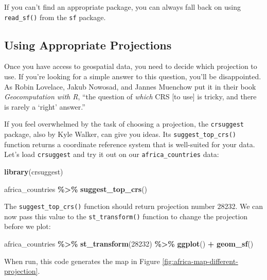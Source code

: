 \documentclass[
]{book}
\newenvironment{Shaded}{\begin{snugshade}}{\end{snugshade}}
\newcommand{\DecValTok}[1]{\textcolor[rgb]{0.00,0.00,0.81}{#1}}
\newcommand{\FunctionTok}[1]{\textcolor[rgb]{0.13,0.29,0.53}{\textbf{#1}}}
\newcommand{\NormalTok}[1]{#1}
\newcommand{\SpecialCharTok}[1]{\textcolor[rgb]{0.81,0.36,0.00}{\textbf{#1}}}
\begin{document}
If you can't find an appropriate package, you can always fall back on using \texttt{read\_sf()} from the \texttt{sf} package.

\hypertarget{using-appropriate-projections}{%
\subsection*{Using Appropriate Projections}\label{using-appropriate-projections}}

Once you have access to geospatial data, you need to decide which projection to use. If you're looking for a simple answer to this question, you'll be disappointed. As Robin Lovelace, Jakub Nowosad, and Jannes Muenchow put it in their book \emph{Geocomputation with R}, ``the question of \emph{which} CRS {[}to use{]} is tricky, and there is rarely a `right' answer.''

If you feel overwhelmed by the task of choosing a projection, the \texttt{crsuggest} package, also by Kyle Walker, can give you ideas. Its \texttt{suggest\_top\_crs()} function returns a coordinate reference system that is well-suited for your data. Let's load \texttt{crsuggest} and try it out on our \texttt{africa\_countries} data:

\begin{Shaded}
\begin{Highlighting}[]
\FunctionTok{library}\NormalTok{(crsuggest)}

\NormalTok{africa\_countries }\SpecialCharTok{\%\textgreater{}\%}
  \FunctionTok{suggest\_top\_crs}\NormalTok{()}
\end{Highlighting}
\end{Shaded}

The \texttt{suggest\_top\_crs()} function should return projection number 28232. We can now pass this value to the \texttt{st\_transform()} function to change the projection before we plot:

\begin{Shaded}
\begin{Highlighting}[]
\NormalTok{africa\_countries }\SpecialCharTok{\%\textgreater{}\%}
  \FunctionTok{st\_transform}\NormalTok{(}\DecValTok{28232}\NormalTok{) }\SpecialCharTok{\%\textgreater{}\%}
  \FunctionTok{ggplot}\NormalTok{() }\SpecialCharTok{+}
  \FunctionTok{geom\_sf}\NormalTok{()}
\end{Highlighting}
\end{Shaded}

When run, this code generates the map in Figure \ref{fig:africa-map-different-projection}.
\end{document}
